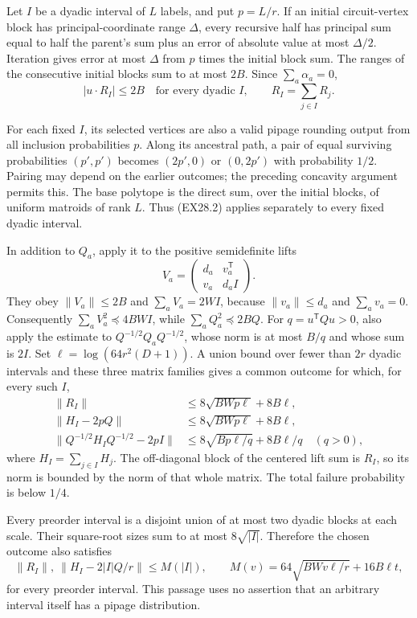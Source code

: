 Let $I$ be a dyadic interval of $L$ labels, and put $p=L/r$.
If an initial circuit-vertex block has principal-coordinate range
$\Delta$, every recursive half has principal sum equal to half
the parent's sum plus an error of absolute value at most
$\Delta/2$. Iteration gives error at most $\Delta$ from $p$
times the initial block sum. The ranges of the consecutive
initial blocks sum to at most $2B$. Since $\sum_a\alpha_a=0$,
\[
 |u\cdot R_I|\le2B
 \quad\text{for every dyadic }I,
 \qquad R_I=\sum_{j\in I}R_j.
 \tag{EX28.3}
\]

For each fixed $I$, its selected vertices are also a valid pipage
rounding output from all inclusion probabilities $p$. Along its
ancestral path, a pair of equal surviving probabilities
$(p',p')$ becomes $(2p',0)$ or $(0,2p')$ with probability
$1/2$. Pairing may depend on the earlier outcomes; the preceding
concavity argument permits this. The base polytope is the direct
sum, over the initial blocks, of uniform matroids of rank $L$.
Thus (EX28.2) applies separately to every fixed dyadic interval.

In addition to $Q_a$, apply it to the positive semidefinite lifts
\[
 V_a=\begin{pmatrix}d_a&v_a^{\mathsf T}\\v_a&d_aI\end{pmatrix}.
\]
They obey $\|V_a\|\le2B$ and $\sum_aV_a=2WI$, because
$\|v_a\|\le d_a$ and $\sum_av_a=0$.
Consequently $\sum_aV_a^2\preceq4BW I$, while
$\sum_aQ_a^2\preceq2BQ$.
For $q=u^{\mathsf T}Qu>0$, also apply the estimate to
$Q^{-1/2}Q_aQ^{-1/2}$, whose norm is at most $B/q$ and
whose sum is $2I$.
Set $\ell=\log(64r^2(D+1))$. A union bound over fewer than
$2r$ dyadic intervals and these three matrix families gives
a common outcome for which, for every such $I$,
\begin{align*}
 \|R_I\|&\le8\sqrt{BWp\ell}+8B\ell,\\
 \|H_I-2pQ\|&\le8\sqrt{BWp\ell}+8B\ell,\\
 \|Q^{-1/2}H_IQ^{-1/2}-2pI\|
   &\le8\sqrt{Bp\ell/q}+8B\ell/q\quad(q>0),
 \tag{EX28.4}
\end{align*}
where $H_I=\sum_{j\in I}H_j$.
The off-diagonal block of the centered lift sum is $R_I$, so
its norm is bounded by the norm of that whole matrix.
The total failure probability is below $1/4$.

Every preorder interval is a disjoint union of at most two
dyadic blocks at each scale. Their square-root sizes sum to at
most $8\sqrt{|I|}$. Therefore the chosen outcome also satisfies
\[
 \|R_I\|,\ \|H_I-2|I|Q/r\|
 \le M(|I|),\qquad
 M(v)=64\sqrt{BWv\ell/r}+16B\ell t,
 \tag{EX28.5}
\]
for every preorder interval. This passage uses no assertion
that an arbitrary interval itself has a pipage distribution.

